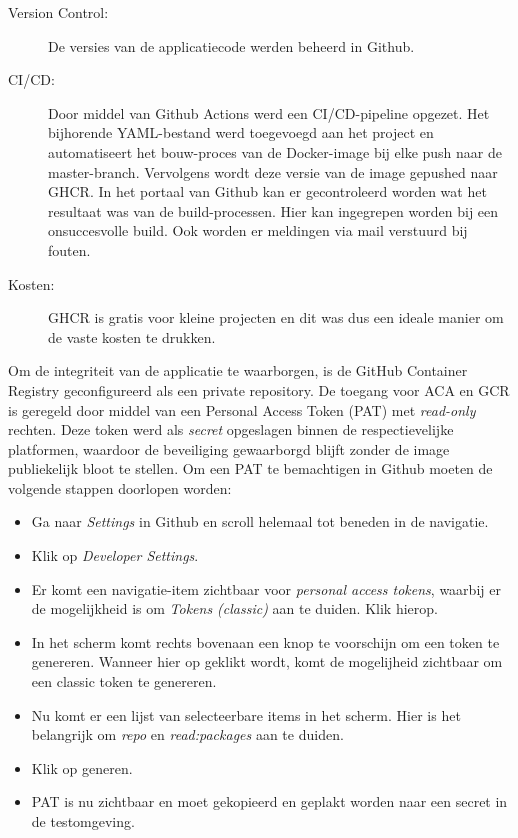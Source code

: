 \begin{description}
    \item[Version Control:] De versies van de applicatiecode werden beheerd in Github.
    \item[CI/CD:] Door middel van Github Actions werd een CI/CD-pipeline opgezet. Het bijhorende YAML-bestand werd toegevoegd aan het project en automatiseert het bouw-proces van de Docker-image bij elke push naar de master-branch. Vervolgens wordt deze versie van de image gepushed naar GHCR. In het portaal van Github kan er gecontroleerd worden wat het resultaat was van de build-processen. Hier kan ingegrepen worden bij een onsuccesvolle build. Ook worden er meldingen via mail verstuurd bij fouten.
    \item[Kosten:] GHCR is gratis voor kleine projecten en dit was dus een ideale manier om de vaste kosten te drukken.
\end{description}

Om de integriteit van de applicatie te waarborgen, is de GitHub Container Registry geconfigureerd als een private repository. De toegang voor ACA en GCR is geregeld door middel van een Personal Access Token (PAT) met \textit{read-only} rechten. Deze token werd als \textit{secret} opgeslagen binnen de respectievelijke platformen, waardoor de beveiliging gewaarborgd blijft zonder de image publiekelijk bloot te stellen. Om een PAT te bemachtigen in Github moeten de volgende stappen doorlopen worden:

\begin{itemize}
    \label{howto:pat-github}
    \item Ga naar \textit{Settings} in Github en scroll helemaal tot beneden in de navigatie.
    \item Klik op \textit{Developer Settings}.
    \item Er komt een navigatie-item zichtbaar voor \textit{personal access tokens}, waarbij er de mogelijkheid is om \textit{Tokens (classic)} aan te duiden. Klik hierop.
    \item In het scherm komt rechts bovenaan een knop te voorschijn om een token te genereren. Wanneer hier op geklikt wordt, komt de mogelijheid zichtbaar om een classic token te genereren.
    \item Nu komt er een lijst van selecteerbare items in het scherm. Hier is het belangrijk om \textit{repo} en \textit{read:packages} aan te duiden.
    \item Klik op generen.
    \item PAT is nu zichtbaar en moet gekopieerd en geplakt worden naar een secret in de testomgeving.
\end{itemize}

